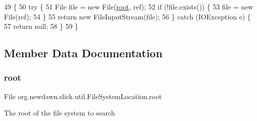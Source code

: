 \begin{DoxyCode}
49                                                        \{
50         \textcolor{keywordflow}{try} \{
51             File file = \textcolor{keyword}{new} File(\mbox{\hyperlink{classorg_1_1newdawn_1_1slick_1_1util_1_1_file_system_location_a63b136315b940762412adc61596fb6cf}{root}}, ref);
52             \textcolor{keywordflow}{if} (!file.exists()) \{
53                 file = \textcolor{keyword}{new} File(ref);
54             \}
55             \textcolor{keywordflow}{return} \textcolor{keyword}{new} FileInputStream(file);
56         \} \textcolor{keywordflow}{catch} (IOException e) \{
57             \textcolor{keywordflow}{return} null;
58         \}
59     \}
\end{DoxyCode}


\subsection{Member Data Documentation}
\mbox{\label{classorg_1_1newdawn_1_1slick_1_1util_1_1_file_system_location_a63b136315b940762412adc61596fb6cf}} 
\subsubsection{\texorpdfstring{root}{root}}
{\footnotesize\ttfamily File org.\+newdawn.\+slick.\+util.\+File\+System\+Location.\+root\hspace{0.3cm}{\ttfamily [private]}}

The root of the file system to search 
